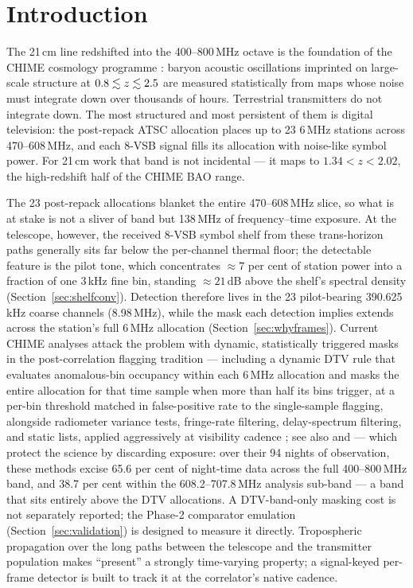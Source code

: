 \section{Introduction}
\label{sec:intro}

The 21\,cm line redshifted into the 400--800\,MHz octave is the foundation
of the CHIME cosmology programme \citep{chang2008baryon, chime2022overview,
chime2023detection, chime2025autopower}: baryon acoustic oscillations
imprinted on large-scale structure at $0.8 \lesssim z \lesssim 2.5$ are measured
statistically from maps whose noise must integrate down over thousands of
hours. Terrestrial transmitters
do not integrate down. The most structured and most persistent of them is
digital television: the post-repack ATSC allocation places up to 23 6\,MHz
stations across 470--608\,MHz, and each 8-VSB signal fills its allocation
with noise-like symbol power. For 21\,cm work that band is not incidental
--- it maps to $1.34 < z < 2.02$, the high-redshift half of the CHIME BAO
range.

The 23 post-repack allocations blanket the entire 470--608\,MHz slice, so
what is at stake is not a sliver of band but 138\,MHz of frequency--time
exposure. At the telescope, however, the received 8-VSB symbol shelf from
these trans-horizon paths generally sits far below the per-channel thermal
floor; the detectable feature is the pilot tone, which concentrates
$\approx 7$ per cent of station power into a fraction of one 3\,kHz fine
bin, standing $\approx 21$\,dB above the shelf's spectral density
(Section~\ref{sec:shelfconv}). Detection therefore lives in the 23
pilot-bearing 390.625\,kHz coarse channels (8.98\,MHz), while the mask each
detection implies extends across the station's full 6\,MHz allocation
(Section~\ref{sec:whyframes}). Current CHIME analyses attack the problem
with dynamic, statistically triggered masks in the post-correlation
flagging tradition \citep{offringa2010sumthreshold, offringa2012aoflagger}
--- including a dynamic DTV rule that evaluates anomalous-bin occupancy
within each 6\,MHz allocation and masks the entire allocation for that
time sample when more than half its bins trigger, at a per-bin threshold
matched in false-positive rate to the single-sample flagging, alongside radiometer
variance tests, fringe-rate filtering, delay-spectrum filtering, and
static lists, applied aggressively at visibility cadence
\citep[Appendix~A]{chime2025autopower}; see also
\citet{rafieiravandi2023rfi} and \citet{taylor2019kurtosis} --- which
protect the science by discarding exposure: over their 94 nights of
observation, these methods excise 65.6 per cent of night-time data
across the full 400--800\,MHz band, and 38.7 per cent within the
608.2--707.8\,MHz analysis sub-band --- a band that sits entirely above
the DTV allocations. A DTV-band-only masking cost is not separately
reported; the Phase-2 comparator emulation
(Section~\ref{sec:validation}) is designed to measure it directly. Tropospheric propagation over the
long paths between the telescope and the transmitter population makes
``present'' a strongly time-varying property; a signal-keyed per-frame
detector is built to track it at the correlator's native cadence.

